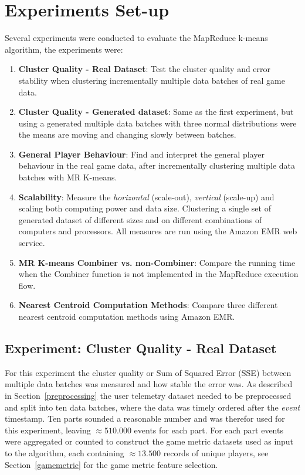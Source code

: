 \section{Experiments Set-up}
\label{sec:experimentsetup}
Several experiments were conducted to evaluate the MapReduce k-means algorithm, the experiments were:
\begin{enumerate}
	\item \textbf{Cluster Quality - Real Dataset}: Test the cluster quality and error stability when clustering incrementally multiple data batches of real game data.
	\item \textbf{Cluster Quality - Generated dataset}: Same as the first experiment, but using a generated multiple data batches with three normal distributions were the means are moving and changing slowly between batches.
	\item \textbf{General Player Behaviour}: Find and interpret the general player behaviour in the real game data, after incrementally clustering multiple data batches with MR K-means.
	\item \textbf{Scalability}: Measure the \textit{horizontal} (scale-out), \textit{vertical} (scale-up) and scaling both computing power and data size. Clustering a single set of generated dataset of different sizes and on different combinations of computers and processors. All measures are run using the Amazon EMR web service.
	\item \textbf{MR K-means Combiner vs. non-Combiner}: Compare the running time when the Combiner function is not implemented in the MapReduce execution flow.
	\item \textbf{Nearest Centroid Computation Methods}: Compare three different nearest centroid computation methods using Amazon EMR.
\end{enumerate}


\subsection{Experiment: Cluster Quality - Real Dataset}
\label{sec:experimentrealdata}
For this experiment the cluster quality or Sum of Squared Error (SSE) between multiple data batches was measured and how stable the error was. As described in Section~\ref{preprocessing} the user telemetry dataset needed to be preprocessed and split into ten data batches, where the data was timely ordered after the \textit{event} timestamp. Ten parts sounded a reasonable number and was therefor used for this experiment, leaving $\approx 510.000$ events for each part. For each part events were aggregated or counted to construct the game metric datasets used as input to the algorithm, each containing $\approx 13.500$ records of unique players, see Section~\ref{gamemetric} for the game metric feature selection. 

